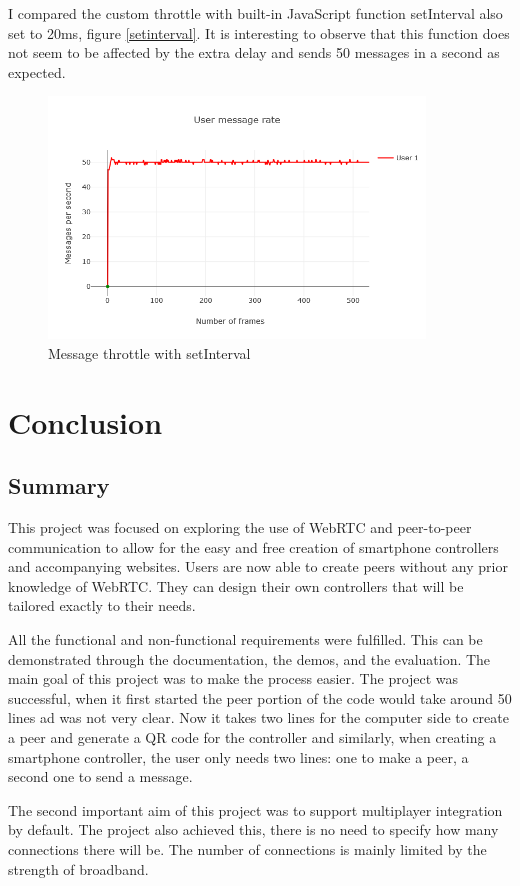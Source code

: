 \documentclass{l4proj}
\begin{document}
I compared the custom throttle with built-in JavaScript function setInterval also set to 20ms, figure \ref{setinterval}. It is interesting to observe that this function does not seem to be affected by the extra delay and sends 50 messages in a second as expected. 


\begin{figure}[h!]
        \centering
        \includegraphics[width=10cm]{./images/setinterval.png} 
        \caption{Message throttle with setInterval}
        \label{setInterval}
\end{figure}


\chapter{Conclusion}    

\section{Summary}
This project was focused on exploring the use of WebRTC and peer-to-peer communication to allow for the easy and free creation of smartphone controllers and accompanying websites. Users are now able to create peers without any prior knowledge of WebRTC. They can design their own controllers that will be tailored exactly to their needs.\par 
All the functional and non-functional requirements were fulfilled. This can be demonstrated through the documentation, the demos, and the evaluation. 
The main goal of this project was to make the process easier. The project was successful, when it first started the peer portion of the code would take around 50 lines ad was not very clear. Now it takes two lines for the computer side to create a peer and generate a QR code for the controller and similarly, when creating a smartphone controller, the user only needs two lines: one to make a peer, a second one to send a message. \par
The second important aim of this project was to support multiplayer integration by default. The project also achieved this, there is no need to specify how many connections there will be. The number of connections is mainly limited by the strength of broadband. 
\end{document}
